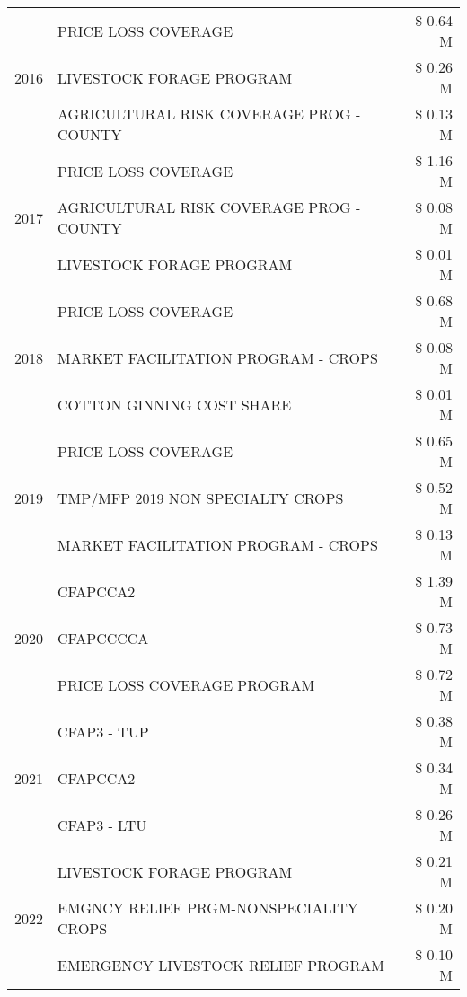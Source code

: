 \begin{tabular}{llr}
\cline{1-3}
\multirow[t]{3}{*}{2016} & PRICE LOSS COVERAGE & \$ 0.64 M \\
 & LIVESTOCK FORAGE PROGRAM & \$ 0.26 M \\
 & AGRICULTURAL RISK COVERAGE PROG - COUNTY & \$ 0.13 M \\
\cline{1-3}
\multirow[t]{3}{*}{2017} & PRICE LOSS COVERAGE & \$ 1.16 M \\
 & AGRICULTURAL RISK COVERAGE PROG - COUNTY & \$ 0.08 M \\
 & LIVESTOCK FORAGE PROGRAM & \$ 0.01 M \\
\cline{1-3}
\multirow[t]{3}{*}{2018} & PRICE LOSS COVERAGE & \$ 0.68 M \\
 & MARKET FACILITATION PROGRAM - CROPS & \$ 0.08 M \\
 & COTTON GINNING COST SHARE & \$ 0.01 M \\
\cline{1-3}
\multirow[t]{3}{*}{2019} & PRICE LOSS COVERAGE & \$ 0.65 M \\
 & TMP/MFP 2019 NON SPECIALTY CROPS & \$ 0.52 M \\
 & MARKET FACILITATION PROGRAM - CROPS & \$ 0.13 M \\
\cline{1-3}
\multirow[t]{3}{*}{2020} & CFAPCCA2 & \$ 1.39 M \\
 & CFAPCCCCA & \$ 0.73 M \\
 & PRICE LOSS COVERAGE PROGRAM & \$ 0.72 M \\
\cline{1-3}
\multirow[t]{3}{*}{2021} & CFAP3 - TUP & \$ 0.38 M \\
 & CFAPCCA2 & \$ 0.34 M \\
 & CFAP3 - LTU & \$ 0.26 M \\
\cline{1-3}
\multirow[t]{3}{*}{2022} & LIVESTOCK FORAGE PROGRAM & \$ 0.21 M \\
 & EMGNCY RELIEF PRGM-NONSPECIALITY CROPS & \$ 0.20 M \\
 & EMERGENCY LIVESTOCK RELIEF PROGRAM & \$ 0.10 M \\
\cline{1-3}
\bottomrule
\end{tabular}
